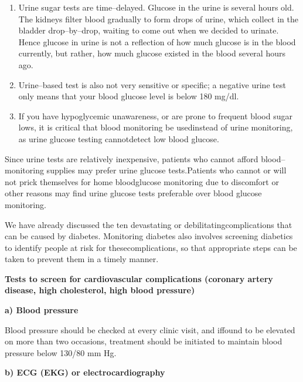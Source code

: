 \vspace{-\topsep}
\begin{enumerate}
\itemsep=0pt
\item Urine sugar tests are time–delayed. Glucose in the urine is seve\-ral hours old. The kidneys filter blood gradually to form drops of urine, which collect in the bladder drop–by–drop, waiting to come out when we decided to urinate. Hence glucose in urine is not a reflection of how much glucose is in the blood currently, but rather, how much glucose existed in the blood several hours ago.
\item Urine–based test is also not very sensitive or specific; a negative urine test only means that your blood glucose level is below 180 mg/dl.
\item If you have hypoglycemic unawareness, or are prone to frequent blood sugar lows, it is critical that blood monitoring be used\break instead of urine monitoring, as urine glucose testing cannot\break detect low blood glucose.
\end{enumerate}
\vspace{-\topsep}

Since urine tests are relatively inexpensive, patients who cannot afford blood–monitoring supplies may prefer urine glucose tests.\break Patients who cannot or will not prick themselves for home blood\break glucose monitoring due to discomfort or other reasons may find urine glucose tests preferable over blood glucose monitoring.


We have already discussed the ten devastating or debilitating\break complications that can be caused by diabetes. Monitoring diabetes also involves screening diabetics to identify people at risk for these\break complications, so that appropriate steps can be taken to prevent them in a timely manner.

\noindent\textbf{Tests to screen for cardiovascular complications (coronary artery disease, high cholesterol, high blood pressure)}

\noindent\textbf{a) Blood pressure}

Blood pressure should be checked at every clinic visit, and if\break found to be elevated on more than two occasions, treatment should be ini\-tiated to maintain blood pressure below 130/80 mm Hg.

\noindent\textbf{b) ECG (EKG) or electrocardiography}

